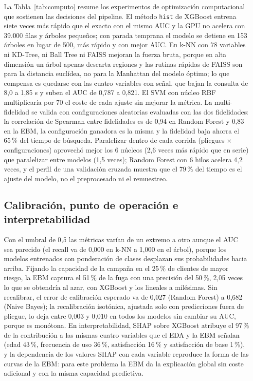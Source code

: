 \documentclass[pdflatex,sn-mathphys-num]{sn-jnl}
\begin{document}


La Tabla~\ref{tab:computo} resume los experimentos de optimización computacional que sostienen las decisiones del pipeline. El método \texttt{hist} de XGBoost entrena siete veces más rápido que el exacto con el mismo AUC y la GPU no acelera con 39.000 filas y árboles pequeños; con parada temprana el modelo se detiene en 153 árboles en lugar de 500, más rápido y con mejor AUC. En k-NN con 78 variables ni KD-Tree, ni Ball Tree ni FAISS mejoran la fuerza bruta, porque en alta dimensión un árbol apenas descarta regiones y las rutinas rápidas de FAISS son para la distancia euclídea, no para la Manhattan del modelo óptimo; lo que compensa es quedarse con las cuatro variables con señal, que bajan la consulta de 8,0 a 1,85 s y suben el AUC de 0,787 a 0,821. El SVM con núcleo RBF multiplicaría por 70 el coste de cada ajuste sin mejorar la métrica. La multi-fidelidad se valida con configuraciones aleatorias evaluadas con las dos fidelidades: la correlación de Spearman entre fidelidades es de 0,94 en Random Forest y 0,83 en la EBM, la configuración ganadora es la misma y la fidelidad baja ahorra el 65\,\% del tiempo de búsqueda. Paralelizar dentro de cada corrida (pliegues $\times$ configuraciones) aprovechó mejor los 6 núcleos (2,6 veces más rápido que en serie) que paralelizar entre modelos (1,5 veces); Random Forest con 6 hilos acelera 4,2 veces, y el perfil de una validación cruzada muestra que el 79\,\% del tiempo es el ajuste del modelo, no el preprocesado ni el remuestreo.



\subsection{Calibración, punto de operación e interpretabilidad}

Con el umbral de 0,5 las métricas varían de un extremo a otro aunque el AUC sea parecido (el recall va de 0,000 en k-NN a 1,000 en el árbol), porque los modelos entrenados con ponderación de clases desplazan sus probabilidades hacia arriba. Fijando la capacidad de la campaña en el 25\,\% de clientes de mayor riesgo, la EBM captura el 51\,\% de la fuga con una precisión del 50\,\%, 2,05 veces lo que se obtendría al azar, con XGBoost y los lineales a milésimas. Sin recalibrar, el error de calibración esperado va de 0,027 (Random Forest) a 0,682 (Naive Bayes); la recalibración isotónica, ajustada solo con predicciones fuera de pliegue, lo deja entre 0,003 y 0,010 en todos los modelos sin cambiar su AUC, porque es monótona. En interpretabilidad, SHAP \cite{lundberg2017shap} sobre XGBoost atribuye el 97\,\% de la contribución a las mismas cuatro variables que el EDA y la EBM señalan (edad 43\,\%, frecuencia de uso 36\,\%, satisfacción 16\,\% y satisfacción de base 1\,\%), y la dependencia de los valores SHAP con cada variable reproduce la forma de las curvas de la EBM: para este problema la EBM da la explicación global sin coste adicional y con la misma capacidad predictiva.
\end{document}
